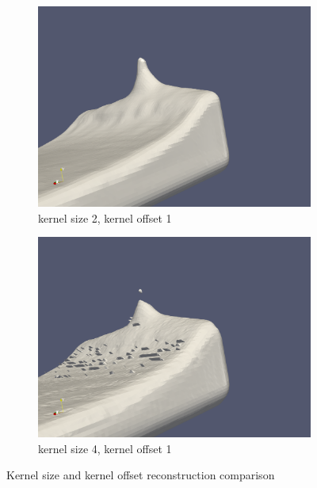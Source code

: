 \begin{figure}
\begin{subfigure}[b]{0.5\textwidth}
               \includegraphics[width=\textwidth]{figures/DBBlur_ks-2_ko-1.png}
               \caption{kernel size 2, kernel offset 1}
               \label{fig:ks2ko1}
        \end{subfigure}        
        \begin{subfigure}[b]{0.5\textwidth}
               \includegraphics[width=\textwidth]{figures/DBBlur_ks-4_ko-1.png}
               \caption{kernel size 4, kernel offset 1}
               \label{fig:ks4ko1}
        \end{subfigure}
        \caption{Kernel size and kernel offset reconstruction comparison}
        \label{fig:ksko}
\end{figure}
